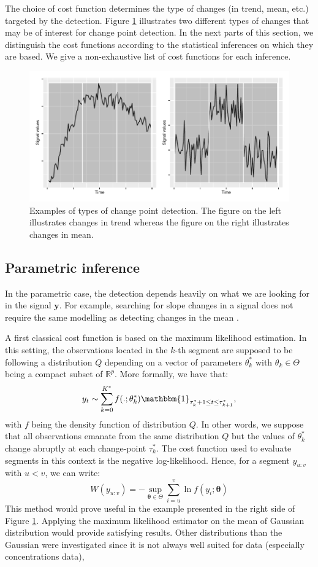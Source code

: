 The choice of cost function determines the type of changes (in trend, mean, etc.) targeted by the detection. Figure \ref{fig:ex_cp} illustrates two different types of changes that may be of interest for change point detection. In the next parts of this section, we distinguish the cost functions according to the statistical inferences on which they are based. We give a non-exhaustive list of cost functions for each inference.

\begin{figure}[ht]
    \centering
    \includegraphics{figs/Chap2/Ex_CP_cost.pdf}
    \caption{Examples of types of change point detection. The figure on the left illustrates changes in trend whereas the figure on the right illustrates changes in mean.}
    \label{fig:ex_cp}
\end{figure}

\subsection{Parametric inference}

In the parametric case, the detection depends heavily on what we are looking for in the signal $\bm y$. For example, searching for slope changes in a signal \citep{Bai1994,Fearnhead2018} does not require the same modelling as detecting changes in the mean \citep{Frick2014,chen2012parametric}. 

A first classical cost function is based on the maximum likelihood estimation. In this setting, the observations located in the $k$-th segment are supposed to be following a distribution $Q$ depending on a vector of parameters $\theta^*_k$ with $\theta_k \in \Theta$ being a compact subset of $\mathbb{R}^p$. More formally, we have that:
$$y_t \sim \sum_{k=0}^{K^*}f(.;\theta^*_k)\mathbbm{1}_{\tau^*_{k}+1\leq t \leq \tau^*_{k+1}},$$
with $f$ being the density function of distribution $Q$. In other words, we suppose that all observations emanate from the same distribution $Q$ but the values of $\theta^*_k$ change abruptly at each change-point $\tau^*_k$. The cost function used to evaluate segments in this context is the negative log-likelihood. Hence, for a segment $y_{u:v}$ with $u < v$, we can write:  
$$W(y_{u:v}) = -\sup_{\bm \theta \in \Theta} \sum_{i = u}^{v} \ln f(y_i; \bm \theta)$$
This method would prove useful in the example presented in the right side of Figure \ref{fig:ex_cp}. Applying the maximum likelihood estimator on the mean of Gaussian distribution would provide satisfying results. Other distributions than the Gaussian were investigated since it is not always well suited for data (especially concentrations data),  

